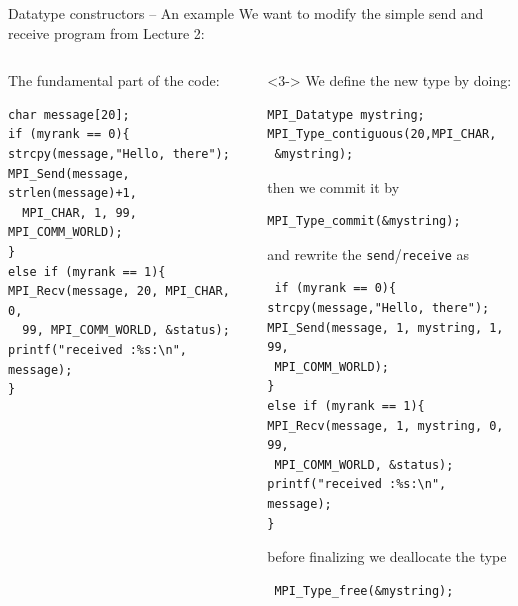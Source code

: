 \documentclass[xcolor={svgnames,usenames}]{beamer}
\begin{document}
\begin{frame}[fragile]{Datatype constructors -- An example}
We want to modify the simple send and receive program from Lecture 2:
\vfill

\begin{columns}
\begin{column}{0.5\columnwidth}
{\normalsize The fundamental part of the code:}
\scriptsize
\begin{verbatim}
char message[20];
if (myrank == 0){ 
strcpy(message,"Hello, there");
MPI_Send(message, strlen(message)+1, 
  MPI_CHAR, 1, 99, MPI_COMM_WORLD);
}
else if (myrank == 1){
MPI_Recv(message, 20, MPI_CHAR, 0, 
  99, MPI_COMM_WORLD, &status);
printf("received :%s:\n", message);
}
\end{verbatim}
\end{column}
\begin{column}{0.5\columnwidth}
\begin{onlyenv}<3->
{\normalsize We define the new type by doing:}
\scriptsize
\begin{verbatim}
MPI_Datatype mystring;
MPI_Type_contiguous(20,MPI_CHAR,
 &mystring);
\end{verbatim}
{\normalsize then we commit it by}
\begin{verbatim}
MPI_Type_commit(&mystring);
\end{verbatim}
{\normalsize and rewrite the \texttt{send}/\texttt{receive} as}
\begin{verbatim}
 if (myrank == 0){
strcpy(message,"Hello, there");
MPI_Send(message, 1, mystring, 1, 99,
 MPI_COMM_WORLD);
}
else if (myrank == 1){
MPI_Recv(message, 1, mystring, 0, 99, 
 MPI_COMM_WORLD, &status);
printf("received :%s:\n", message);
}
\end{verbatim}
{\normalsize before finalizing we deallocate the type}
\begin{verbatim}
 MPI_Type_free(&mystring);
\end{verbatim}
\end{onlyenv}
\end{column}
\end{columns}
\end{frame}
\end{document}
